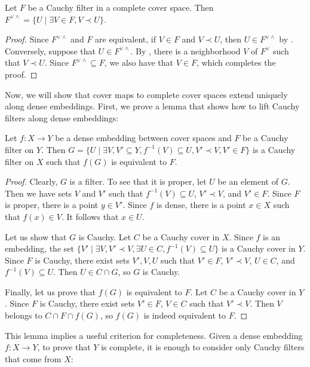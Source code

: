 \documentclass[reqno]{amsart}
\theoremstyle{definition}
\theoremstyle{remark}
\numberwithin{figure}{section}
\newcommand{\rb}{\prec}
\begin{document}
\begin{lem}
Let $F$ be a Cauchy filter in a complete cover space.
Then $F^{\vee \wedge} = \{ U \mid \exists V \in F, V \rb U \}$.
\end{lem}
\begin{proof}
Since $F^{\vee \wedge}$ and $F$ are equivalent, if $V \in F$ and $V \rb U$, then $U \in F^{\vee \wedge}$ by .
Conversely, suppose that $U \in F^{\vee \wedge}$.
By , there is a neighborhood $V$ of $F^\vee$ such that $V \rb U$.
Since $F^{\vee \wedge} \subseteq F$, we also have that $V \in F$, which completes the proof.
\end{proof}

Now, we will show that cover maps to complete cover spaces extend uniquely along dense embeddings.
First, we prove a lemma that shows how to lift Cauchy filters along dense embeddings:

\begin{lem}
Let $f : X \to Y$ be a dense embedding between cover spaces and $F$ be a Cauchy filter on $Y$.
Then $G = \{ U \mid \exists V,V' \subseteq Y, f^{-1}(V) \subseteq U, V' \rb V, V' \in F \}$ is a Cauchy filter on $X$ such that $f(G)$ is equivalent to $F$.
\end{lem}
\begin{proof}
Clearly, $G$ is a filter.
To see that it is proper, let $U$ be an element of $G$.
Then we have sets $V$ and $V'$ such that $f^{-1}(V) \subseteq U$, $V' \rb V$, and $V' \in F$.
Since $F$ is proper, there is a point $y \in V'$.
Since $f$ is dense, there is a point $x \in X$ such that $f(x) \in V$.
It follows that $x \in U$.

Let us show that $G$ is Cauchy.
Let $C$ be a Cauchy cover in $X$.
Since $f$ is an embedding, the set $\{ V' \mid \exists V, V' \rb V, \exists U \in C, f^{-1}(V) \subseteq U \}$ is a Cauchy cover in $Y$.
Since $F$ is Cauchy, there exist sets $V',V,U$ such that $V' \in F$, $V' \rb V$, $U \in C$, and $f^{-1}(V) \subseteq U$.
Then $U \in C \cap G$, so $G$ is Cauchy.

Finally, let us prove that $f(G)$ is equivalent to $F$.
Let $C$ be a Cauchy cover in $Y$.
Since $F$ is Cauchy, there exist sets $V' \in F$, $V \in C$ such that $V' \rb V$.
Then $V$ belongs to $C \cap F \cap f(G)$, so $f(G)$ is indeed equivalent to $F$.
\end{proof}

This lemma implies a useful criterion for completeness.
Given a dense embedding $f : X \to Y$, to prove that $Y$ is complete, it is enough to consider only Cauchy filters that come from $X$:
\end{document}
